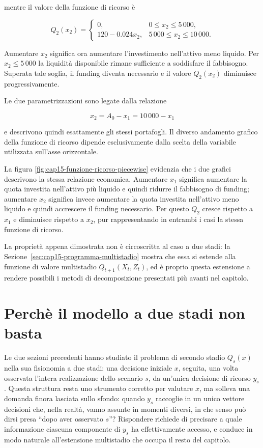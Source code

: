 mentre il valore della funzione di ricorso \`e

\[
Q_2(x_2)
=
\begin{cases}
0, & 0\leq x_2\leq5\,000,\\[4pt]
120-0.024x_2, & 5\,000\leq x_2\leq10\,000.
\end{cases}
\]

Aumentare $x_2$ significa ora aumentare l'investimento nell'attivo meno
liquido. Per $x_2\leq5\,000$ la liquidit\`a disponibile rimane sufficiente
a soddisfare il fabbisogno. Superata tale soglia, il funding diventa
necessario e il valore $Q_2(x_2)$ diminuisce progressivamente.

Le due parametrizzazioni sono legate dalla relazione

\[
x_2=A_0-x_1=10\,000-x_1
\]

e descrivono quindi esattamente gli stessi portafogli. Il diverso andamento
grafico della funzione di ricorso dipende esclusivamente dalla scelta della
variabile utilizzata sull'asse orizzontale.

La figura \ref{fig:cap15-funzione-ricorso-piecewise} evidenzia che i due grafici descrivono la stessa relazione economica.
Aumentare $x_1$ significa aumentare la quota investita nell'attivo pi\`u
liquido e quindi ridurre il fabbisogno di funding; aumentare $x_2$ significa
invece aumentare la quota investita nell'attivo meno liquido e quindi
accrescere il funding necessario. Per questo $Q_2$ cresce rispetto a $x_1$
e diminuisce rispetto a $x_2$, pur rappresentando in entrambi i casi la stessa
funzione di ricorso.






La propriet\`a appena dimostrata non \`e circoscritta al caso a due stadi: la Sezione~\ref{sec:cap15-programma-multistadio} mostra che essa si estende alla funzione di valore multistadio $Q_{t+1}(X_t,Z_t)$, ed \`e proprio questa estensione a rendere possibili i metodi di decomposizione presentati pi\`u avanti nel capitolo.


\section{Perch\`e il modello a due stadi non basta}

\label{sec:cap15-motivazione-multistadio}

Le due sezioni precedenti hanno studiato il problema di secondo stadio
$Q_s(x)$ nella sua fisionomia a due stadi: una decisione iniziale $x$,
seguita, una volta osservata l'intera realizzazione dello scenario $s$, da
un'unica decisione di ricorso $y_s$. Questa struttura resta uno strumento
corretto per valutare $x$, ma solleva una domanda finora lasciata sullo
sfondo: quando $y_s$ raccoglie in un unico vettore decisioni che, nella
realt\`a, vanno assunte in momenti diversi, in che senso pu\`o dirsi presa
``dopo aver osservato $s$''? Rispondere richiede di precisare a quale
informazione ciascuna componente di $y_s$ ha effettivamente accesso, e
conduce in modo naturale all'estensione multistadio che occupa il resto del
capitolo.


